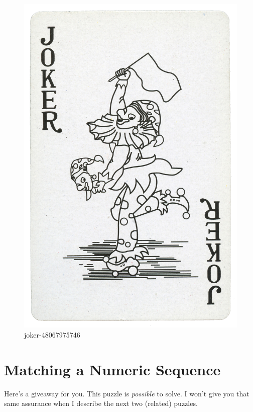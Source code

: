\begin{figure}
\centering
\includegraphics{images/joker-48067975746_0db0b8eba0_o.jpg}
\caption{joker-48067975746}
\end{figure}

\newpage

\hypertarget{matching-a-numeric-sequence}{%
\section{Matching a Numeric
Sequence}\label{matching-a-numeric-sequence}}

Here's a giveaway for you. This puzzle is \emph{possible} to solve. I
won't give you that same assurance when I describe the next two
(related) puzzles.

